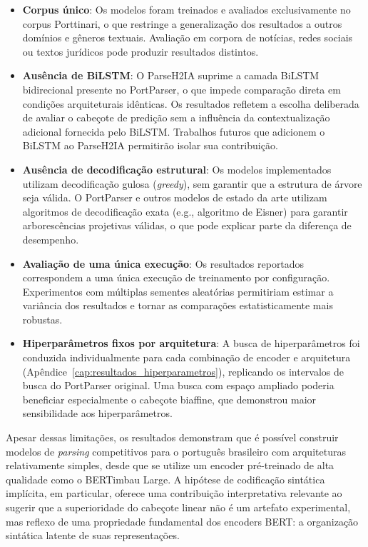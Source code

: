 \begin{itemize}
  \item \textbf{Corpus único}: Os modelos foram treinados e avaliados exclusivamente no corpus
        Porttinari, o que restringe a generalização dos resultados a outros domínios e gêneros
        textuais. Avaliação em corpora de notícias, redes sociais ou textos jurídicos pode
        produzir resultados distintos.

  \item \textbf{Ausência de BiLSTM}: O ParseH2IA suprime a camada BiLSTM bidirecional presente
        no PortParser, o que impede comparação direta em condições arquiteturais idênticas. Os
        resultados refletem a escolha deliberada de avaliar o cabeçote de predição sem a influência
        da contextualização adicional fornecida pelo BiLSTM. Trabalhos futuros que adicionem o
        BiLSTM ao ParseH2IA permitirão isolar sua contribuição.

  \item \textbf{Ausência de decodificação estrutural}: Os modelos implementados utilizam
        decodificação gulosa (\textit{greedy}), sem garantir que a estrutura de árvore seja
        válida. O PortParser e outros modelos de estado da arte utilizam algoritmos de
        decodificação exata (e.g., algoritmo de Eisner) para garantir arborescências projetivas
        válidas, o que pode explicar parte da diferença de desempenho.

  \item \textbf{Avaliação de uma única execução}: Os resultados reportados correspondem a uma
        única execução de treinamento por configuração. Experimentos com múltiplas sementes
        aleatórias permitiriam estimar a variância dos resultados e tornar as comparações
        estatisticamente mais robustas.

  \item \textbf{Hiperparâmetros fixos por arquitetura}: A busca de hiperparâmetros foi conduzida
        individualmente para cada combinação de encoder e arquitetura
        (Apêndice~\ref{cap:resultados_hiperparametros}), replicando os intervalos de busca do
        PortParser original. Uma busca com espaço ampliado poderia beneficiar especialmente o
        cabeçote biaffine, que demonstrou maior sensibilidade aos hiperparâmetros.
\end{itemize}

Apesar dessas limitações, os resultados demonstram que é possível construir modelos de
\textit{parsing} competitivos para o português brasileiro com arquiteturas relativamente simples,
desde que se utilize um encoder pré-treinado de alta qualidade como o BERTimbau Large. A hipótese
de codificação sintática implícita, em particular, oferece uma contribuição interpretativa
relevante ao sugerir que a superioridade do cabeçote linear não é um artefato experimental,
mas reflexo de uma propriedade fundamental dos encoders BERT: a organização sintática latente
de suas representações.
